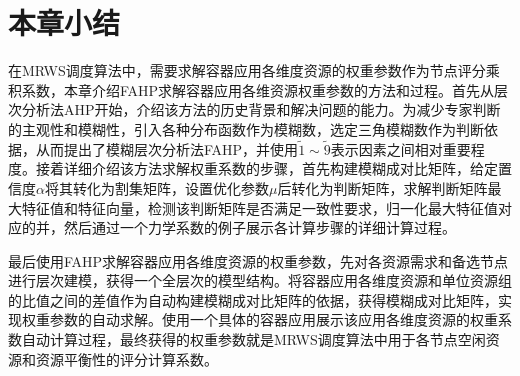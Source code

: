 \section{本章小结}
在MRWS调度算法中，需要求解容器应用各维度资源的权重参数作为节点评分乘积系数，本章介绍FAHP求解容器应用各维资源权重参数的方法和过程。首先从层次分析法AHP开始，介绍该方法的历史背景和解决问题的能力。为减少专家判断的主观性和模糊性，引入各种分布函数作为模糊数，选定三角模糊数作为判断依据，从而提出了模糊层次分析法FAHP，并使用$\widetilde{1}\sim\widetilde{9}$表示因素之间相对重要程度。接着详细介绍该方法求解权重系数的步骤，首先构建模糊成对比矩阵，给定置信度$\alpha$将其转化为割集矩阵，设置优化参数$\mu$后转化为判断矩阵，求解判断矩阵最大特征值和特征向量，检测该判断矩阵是否满足一致性要求，归一化最大特征值对应的并，然后通过一个力学系数的例子展示各计算步骤的详细计算过程。

最后使用FAHP求解容器应用各维度资源的权重参数，先对各资源需求和备选节点进行层次建模，获得一个全层次的模型结构。将容器应用各维度资源和单位资源组的比值之间的差值作为自动构建模糊成对比矩阵的依据，获得模糊成对比矩阵，实现权重参数的自动求解。使用一个具体的容器应用展示该应用各维度资源的权重系数自动计算过程，最终获得的权重参数就是MRWS调度算法中用于各节点空闲资源和资源平衡性的评分计算系数。








